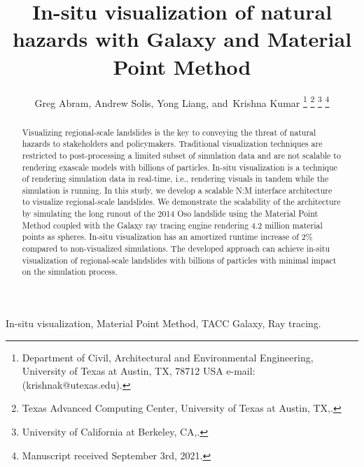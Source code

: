 \documentclass[journal]{IEEEtran}
\begin{document}
\title{In-situ visualization of natural hazards with Galaxy and Material Point Method}
\author{Greg Abram, %
        Andrew Solis,
        Yong Liang,
        and~Krishna Kumar%
\thanks{Department of Civil, Architectural and Environmental Engineering, University of Texas at Austin, TX, 78712 USA e-mail: (krishnak@utexas.edu).}%
\thanks{Texas Advanced Computing Center, University of Texas at Austin, TX,.}%
\thanks{University of California at Berkeley, CA,.}%
\thanks{Manuscript received September 3rd, 2021.}}

%
{}


\maketitle

\begin{abstract}
Visualizing regional-scale landslides is the key to conveying the threat of natural hazards to stakeholders and policymakers. Traditional visualization techniques are restricted to post-processing a limited subset of simulation data and are not scalable to rendering exascale models with billions of particles. In-situ visualization is a technique of rendering simulation data in real-time, i.e., rendering visuals in tandem while the simulation is running. In this study, we develop a scalable N:M interface architecture to visualize regional-scale landslides. We demonstrate the scalability of the architecture by simulating the long runout of the 2014 Oso landslide using the Material Point Method coupled with the Galaxy ray tracing engine rendering 4.2 million material points as spheres. In-situ visualization has an amortized runtime increase of 2\% compared to non-visualized simulations. The developed approach can achieve in-situ visualization of regional-scale landslides with billions of particles with minimal impact on the simulation process.
\end{abstract}

\begin{IEEEkeywords}
In-situ visualization, Material Point Method, TACC Galaxy, Ray tracing.
\end{IEEEkeywords}
\end{document}
